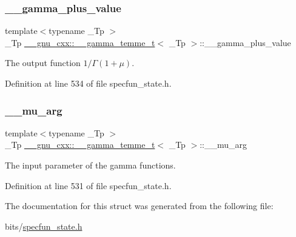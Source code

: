 \subsubsection{\texorpdfstring{\+\_\+\+\_\+gamma\+\_\+plus\+\_\+value}{\_\_gamma\_plus\_value}}
{\footnotesize\ttfamily template$<$typename \+\_\+\+Tp $>$ \\
\+\_\+\+Tp \hyperlink{struct____gnu__cxx_1_1____gamma__temme__t}{\+\_\+\+\_\+gnu\+\_\+cxx\+::\+\_\+\+\_\+gamma\+\_\+temme\+\_\+t}$<$ \+\_\+\+Tp $>$\+::\+\_\+\+\_\+gamma\+\_\+plus\+\_\+value}



The output function $ 1/\Gamma(1 + \mu) $. 



Definition at line 534 of file specfun\+\_\+state.\+h.

\mbox{\label{struct____gnu__cxx_1_1____gamma__temme__t_a841e7c549dd505de260018ddaa020565}} 
\subsubsection{\texorpdfstring{\+\_\+\+\_\+mu\+\_\+arg}{\_\_mu\_arg}}
{\footnotesize\ttfamily template$<$typename \+\_\+\+Tp $>$ \\
\+\_\+\+Tp \hyperlink{struct____gnu__cxx_1_1____gamma__temme__t}{\+\_\+\+\_\+gnu\+\_\+cxx\+::\+\_\+\+\_\+gamma\+\_\+temme\+\_\+t}$<$ \+\_\+\+Tp $>$\+::\+\_\+\+\_\+mu\+\_\+arg}



The input parameter of the gamma functions. 



Definition at line 531 of file specfun\+\_\+state.\+h.



The documentation for this struct was generated from the following file\+:\begin{DoxyCompactItemize}
\item 
bits/\hyperlink{specfun__state_8h}{specfun\+\_\+state.\+h}\end{DoxyCompactItemize}
